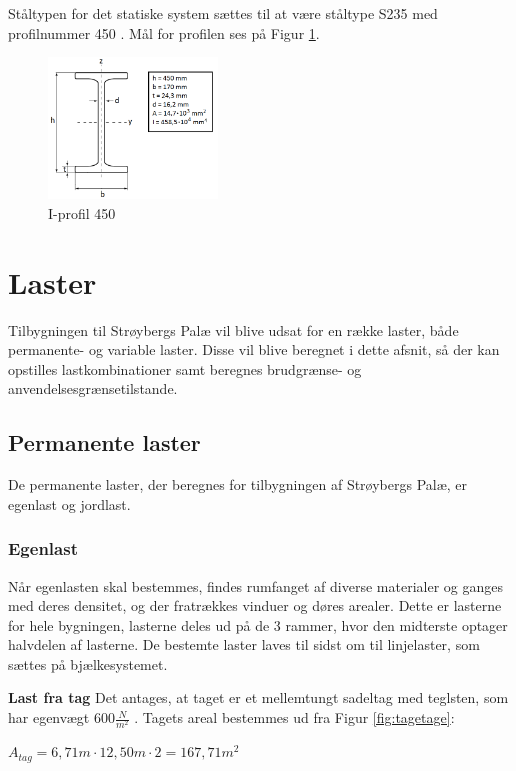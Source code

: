 Ståltypen for det statiske system sættes til at være ståltype S235 med profilnummer 450 \citep{stabi}. Mål for profilen ses på Figur \ref{fig:iprofil}. 

\begin{figure}[H]
	\centering
	\includegraphics[width=0.4\textwidth]{billeder/iprofil.png}
	\caption{I-profil 450}
	\label{fig:iprofil}
\end{figure}

\section{Laster}
Tilbygningen til Strøybergs Palæ vil blive udsat for en række laster, både permanente- og variable laster. Disse vil blive beregnet i dette afsnit, så der kan opstilles lastkombinationer samt beregnes brudgrænse- og anvendelsesgrænsetilstande.

\subsection{Permanente laster}
De permanente laster, der beregnes for tilbygningen af Strøybergs Palæ, er egenlast og jordlast.

\subsubsection{Egenlast}
Når egenlasten skal bestemmes, findes rumfanget af diverse materialer og ganges med deres densitet, og der fratrækkes vinduer og døres arealer. Dette er lasterne for hele bygningen, lasterne deles ud på de 3 rammer, hvor den midterste optager halvdelen af lasterne. De bestemte laster laves til sidst om til linjelaster, som sættes på bjælkesystemet.  

\textbf{Last fra tag}
\newline
Det antages, at taget er et mellemtungt sadeltag med teglsten, som har egenvægt $600 \frac{N}{m^2}$ \citep{tag}.
\newline
\newline
Tagets areal bestemmes ud fra Figur \ref{fig:tagetage}:
\begin{center}
	$A_{tag} = 6,\!71 m\cdot 12,\!50 m \cdot 2=167,\!71 m^2$
\end{center}


